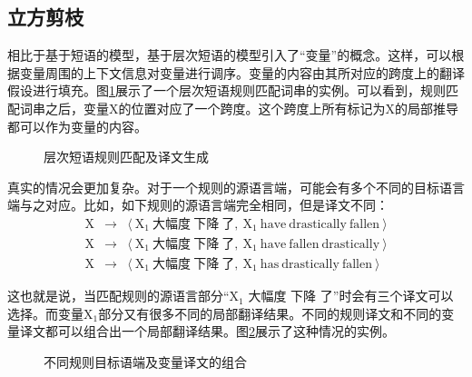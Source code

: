 
\subsection{立方剪枝}

\parinterval 相比于基于短语的模型，基于层次短语的模型引入了``变量''的概念。这样，可以根据变量周围的上下文信息对变量进行调序。变量的内容由其所对应的跨度上的翻译假设进行填充。图\ref{fig:4-38}展示了一个层次短语规则匹配词串的实例。可以看到，规则匹配词串之后，变量X的位置对应了一个跨度。这个跨度上所有标记为X的局部推导都可以作为变量的内容。

\begin{figure}[htp]
\centering

\caption{层次短语规则匹配及译文生成}
\label{fig:4-38}
\end{figure}

\parinterval 真实的情况会更加复杂。对于一个规则的源语言端，可能会有多个不同的目标语言端与之对应。比如，如下规则的源语言端完全相同，但是译文不同：
\begin{eqnarray}
\textrm{X} & \to & \langle\ \textrm{X}_1\ \text{大幅度}\ \text{下降}\ \text{了},\ \textrm{X}_1\ \textrm{have}\ \textrm{drastically}\ \textrm{fallen}\ \rangle \nonumber \\
\textrm{X} & \to & \langle\ \textrm{X}_1\ \text{大幅度}\ \text{下降}\ \text{了},\ \textrm{X}_1\ \textrm{have}\ \textrm{fallen}\ \textrm{drastically}\ \rangle \nonumber \\
\textrm{X} & \to & \langle\ \textrm{X}_1\ \text{大幅度}\ \text{下降}\ \text{了},\ \textrm{X}_1\ \textrm{has}\ \textrm{drastically}\ \textrm{fallen}\ \rangle \nonumber
\end{eqnarray}

\parinterval 这也就是说，当匹配规则的源语言部分``$\textrm{X}_1$ 大幅度 下降 了''时会有三个译文可以选择。而变量$\textrm{X}_1$部分又有很多不同的局部翻译结果。不同的规则译文和不同的变量译文都可以组合出一个局部翻译结果。图\ref{fig:4-39}展示了这种情况的实例。

\begin{figure}[htp]
\centering

\caption{不同规则目标语端及变量译文的组合}
\label{fig:4-39}
\end{figure}

